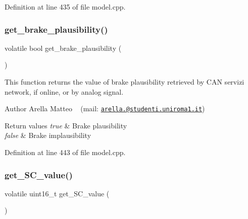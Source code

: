 Definition at line 435 of file model.\+cpp.

\mbox{\label{group___board__model__group_gad47b702f79115e19d75b22f39b45efeb}} 
\subsubsection{\texorpdfstring{get\+\_\+brake\+\_\+plausibility()}{get\_brake\_plausibility()}}
{\footnotesize\ttfamily volatile bool get\+\_\+brake\+\_\+plausibility (\begin{DoxyParamCaption}{ }\end{DoxyParamCaption})}



This function returns the value of brake plausibility retrieved by C\+AN servizi network, if online, or by analog signal. 

\begin{DoxyAuthor}{Author}
Arella Matteo ~\newline
 (mail\+: \href{mailto:arella.1646983@studenti.uniroma1.it}{\tt arella.@studenti.\+uniroma1.\+it})
\end{DoxyAuthor}

\begin{DoxyRetVals}{Return values}
{\em true} & Brake plausibility \\
\hline
{\em false} & Brake implausibility \\
\hline
\end{DoxyRetVals}


Definition at line 443 of file model.\+cpp.

\mbox{\label{group___board__model__group_ga36eddbc000c8d1820fd2a644a39c87ea}} 
\subsubsection{\texorpdfstring{get\+\_\+\+S\+C\+\_\+value()}{get\_SC\_value()}}
{\footnotesize\ttfamily volatile uint16\+\_\+t get\+\_\+\+S\+C\+\_\+value (\begin{DoxyParamCaption}{ }\end{DoxyParamCaption})}



